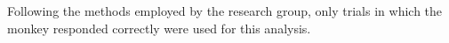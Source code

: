 Following the methods employed by the research group, only trials in which the monkey responded correctly were used for this analysis.

% 


